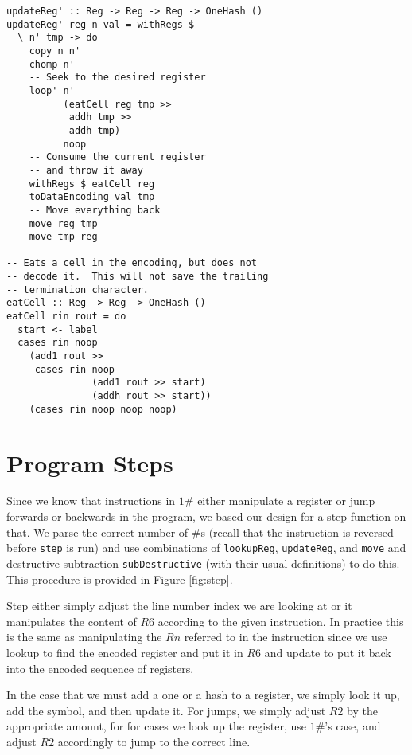 \documentclass[10pt, preprint, nocopyrightspace]{sigplanconf}
\newcommand{\oh}{$1\#$\xspace}
\newcommand{\figref}[1]{Figure \ref{#1}}
\begin{document}
\begin{minipage}{.48\textwidth}
\begin{lstlisting}
updateReg' :: Reg -> Reg -> Reg -> OneHash ()
updateReg' reg n val = withRegs $
  \ n' tmp -> do
    copy n n'
    chomp n'
    -- Seek to the desired register
    loop' n'
          (eatCell reg tmp >>
           addh tmp >>
           addh tmp)
          noop
    -- Consume the current register
    -- and throw it away
    withRegs $ eatCell reg
    toDataEncoding val tmp
    -- Move everything back
    move reg tmp
    move tmp reg

-- Eats a cell in the encoding, but does not
-- decode it.  This will not save the trailing
-- termination character.
eatCell :: Reg -> Reg -> OneHash ()
eatCell rin rout = do
  start <- label
  cases rin noop
    (add1 rout >>
     cases rin noop
               (add1 rout >> start)
               (addh rout >> start))
    (cases rin noop noop noop)
\end{lstlisting}
\end{minipage}

\section{Program Steps}

Since we know that instructions in \oh either manipulate a register or jump
forwards or backwards in the program, we based our design for a step function on
that. We parse the correct number of $\#$s (recall that the instruction is
reversed before \lstinline{step} is run) and use combinations of
\lstinline{lookupReg}, \lstinline{updateReg}, and \lstinline{move} and
destructive subtraction \lstinline{subDestructive} (with their usual
definitions) to do this. This procedure is provided in \figref{fig:step}. 

Step either simply adjust the line number index we are looking at or it
manipulates the content of $R6$ according to the given instruction. 
In practice this is the same as manipulating the $Rn$ referred to in the
instruction since we use lookup to find the encoded register and put it in $R6$
and update to put it back into the encoded sequence of registers. 

In the case that we must add a one or a hash to a
register, we simply look it up, add the symbol, and then update it. For jumps,
we simply adjust $R2$ by the appropriate amount, for for cases we look up the
register, use \oh's case, and adjust $R2$ accordingly to jump to the correct
line.
\end{document}

